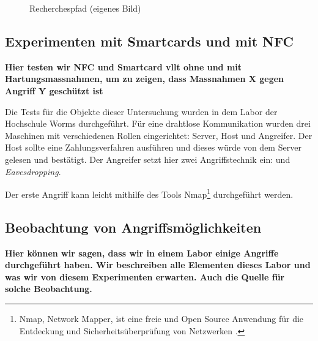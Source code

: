 \begin{landscape}
  \thispagestyle{mylandscape}
  \begin{figure}[h]  
  \centering
         \caption{Recherchespfad (eigenes Bild)}
          \label{fig:diagramfrage}
  \end{figure}
\end{landscape}


\subsection{Experimenten mit Smartcards und mit NFC}
\textbf{Hier testen wir NFC und Smartcard vllt ohne und mit Hartungsmassnahmen, um zu zeigen, dass Massnahmen X gegen
Angriff Y geschützt ist}

Die Tests für die Objekte dieser Untersuchung wurden in dem Labor der Hochschule Worms durchgeführt. Für eine drahtlose
Kommunikation wurden drei Maschinen mit verschiedenen Rollen eingerichtet: Server, Host und Angreifer. Der Host sollte 
eine Zahlungsverfahren ausführen und dieses würde von dem Server gelesen und bestätigt. Der Angreifer setzt hier zwei
Angriffstechnik ein:  und \textit{Eavesdropping}.

Der erste Angriff kann leicht mithilfe des Tools Nmap\footnote{Nmap, Network Mapper, ist eine freie und Open Source Anwendung
für die Entdeckung und Sicherheitsüberprüfung von Netzwerken \cite{refst:nmap}.} durchgeführt werden.
 

\subsection{Beobachtung von Angriffsmöglichkeiten}
\textbf{Hier können wir sagen, dass wir in einem Labor einige Angriffe durchgeführt haben. Wir beschreiben alle Elementen
dieses Labor und was wir von diesem Experimenten erwarten. Auch die Quelle für solche Beobachtung.}

